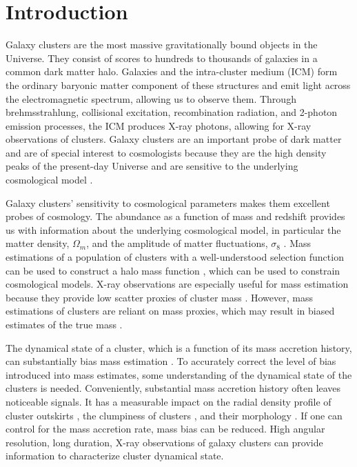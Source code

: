 \documentclass[twocolumn, 11pt]{aastex63}%
\begin{document}
\section{Introduction}\label{introduction}

Galaxy clusters are the most massive gravitationally bound objects in the Universe. They consist of scores to hundreds to thousands of galaxies in a common dark matter halo. Galaxies and the intra-cluster medium (ICM) form the ordinary baryonic matter component of these structures and emit light across the electromagnetic spectrum, allowing us to observe them. Through brehmsstrahlung, collisional excitation, recombination radiation, and 2-photon emission processes, the ICM produces X-ray photons, allowing for X-ray observations of clusters. Galaxy clusters are an important probe of dark matter \citep[e.g.,][]{Clowe_2006} and are of special interest to cosmologists because they are the high density peaks of the present-day Universe and are sensitive to the underlying cosmological model \citep[see][for a recent review]{Pratt_2019}.

Galaxy clusters' sensitivity to cosmological parameters makes them excellent probes of cosmology. The abundance as a function of mass and redshift provides us with information about the underlying cosmological model, in particular the matter density, $\Omega_m$, and the amplitude of matter fluctuations, $\sigma_8$ \citep{Allen_2011, Kravtsov_Borgani_2012, Pratt_2019}. Mass estimations of a population of clusters with a well-understood selection function can be used to construct a halo mass function \citep[e.g.,][]{Tinker_2008, Bocquet_2016}, which can be used to constrain cosmological models. X-ray observations are especially useful for mass estimation because they provide low scatter proxies of cluster mass \citep[e.g.,][]{Kravtsov_2006}. However, mass estimations of clusters are reliant on mass proxies, which may result in biased estimates of the true mass \citep[e.g.,][]{Nagai_2007, Lau_2013, Nelson_2014, Shi_2016, Biffi_2016, Barnes_2021}. 

The dynamical state of a cluster, which is a function of its mass accretion history, can substantially bias mass estimation \citep[e.g.,][]{Lau_2009, Nelson_2014, Shi_2015}. To accurately correct the level of bias introduced into mass estimates, some understanding of the dynamical state of the clusters is needed. Conveniently, substantial mass accretion history often leaves noticeable signals. It has a measurable impact on the radial density profile of cluster outskirts \citep{Diemer_2014}, the clumpiness of clusters \citep{Diasuke_Lau_2011}, and their morphology \citep{Evrard_1993}. If one can control for the mass accretion rate, mass bias can be reduced.  High angular resolution, long duration, X-ray observations of galaxy clusters can provide information to characterize cluster dynamical state.
\end{document}
